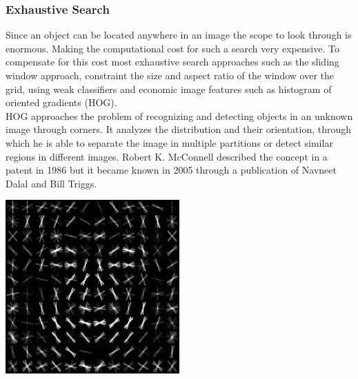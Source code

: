 \subsubsection{Exhaustive Search}
Since an object can be located anywhere in an image the scope to look through is enormous. Making the computational cost for such a search very
expensive. To compensate for this cost most exhaustive search approaches such as the sliding window approach, constraint the size and aspect
ratio of the window over the grid, using weak classifiers and economic image features such as histogram of oriented gradients
(HOG).\cite{selectivesearch} \\
HOG approaches the problem of recognizing and detecting objects in an unknown image through corners. It analyzes the distribution and their
orientation, through which he is able to separate the image in multiple partitions or detect similar regions in different images.
Robert K. McConnell described the concept in a patent in 1986 but it became known in 2005 through a publication of Navneet Dalal and Bill
Triggs.\cite{wiki_hog}
\vspace{0.5cm}
\begin{center}
    \includegraphics[width=0.5\textwidth]{images/Dlib_Learned-HOG-Detector.jpg} \cite{wiki_hog}
\end{center}

